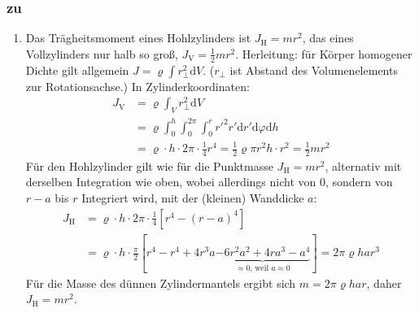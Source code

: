 \documentclass[a4paper]{scrartcl}
\begin{document}
\subsubsection{zu }
\label{lsg:WalzeSchiefeEbene}
\begin{enumerate}[noitemsep]
  \item Das Trägheitsmoment eines Hohlzylinders ist $J_\text{H} = mr^2$, das eines Vollzylinders nur halb so groß, $J_\text{V} = \frac{1}{2}mr^2$. Herleitung: für Körper homogener Dichte gilt allgemein $J = \varrho \int r_\bot^2\text{d}V$. ($r_\bot$ ist Abstand des Volumenelements zur Rotationsachse.) In Zylinderkoordinaten:
    \begin{align*}
      J_\text{V} &= \varrho \int_V r_\bot^2\text{d}V \\
      &= \varrho \int_0^h \int _0^{2\pi} \int _0^r r'^2 r' \text{d}r' \text{d}\varphi \text{d}h\\
      &= \varrho \cdot h \cdot 2\pi \cdot \frac{1}{4}r^4 = \frac{1}{2} \varrho\pi r^2 h \cdot r^2 = \frac{1}{2} m r^2
    \end{align*}
    Für den Hohlzylinder gilt wie für die Punktmasse $J_\text{H} = mr^2$, alternativ mit derselben Integration wie oben, wobei allerdings nicht von $0$, sondern von $r-a$ bis $r$ Integriert wird, mit der (kleinen) Wanddicke $a$:
    \begin{align*}
      J_\text{H} & = \varrho \cdot h \cdot 2\pi \cdot \frac{1}{4} \left[ r^4 - (r-a)^4 \right]\\
      &= \varrho \cdot h \cdot \frac{\pi}{2} \left[ r^4 - r^4 + 4r^3a \underbrace{- 6r^2a^2 + 4ra^3 - a^4}_{\approx 0 \text{, weil } a \approx 0} \right] = 2 \pi \varrho h a r^3
    \end{align*}
    Für die Masse des dünnen Zylindermantels ergibt sich $m = 2\pi \varrho har$, daher $J_\text{H} = mr^2$.
\end{enumerate}
\end{document}

